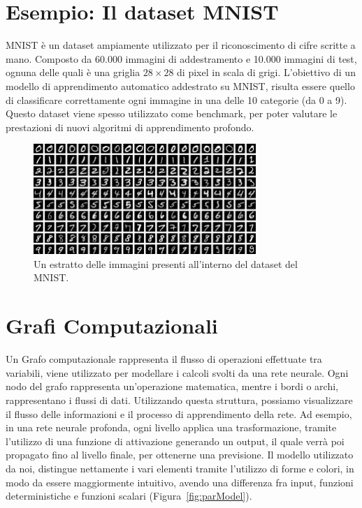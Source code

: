 \section{Esempio: Il dataset MNIST}
MNIST è un dataset ampiamente utilizzato per il riconoscimento di cifre scritte a mano. Composto da 60.000 immagini di addestramento e 10.000 immagini di test, ognuna delle quali è una griglia $28\times28$ di pixel in scala di grigi. L'obiettivo di un modello di apprendimento automatico addestrato su MNIST, risulta essere quello di classificare correttamente ogni immagine in una delle 10 categorie (da 0 a 9). Questo dataset viene spesso utilizzato come benchmark, per poter valutare le prestazioni di nuovi algoritmi di apprendimento profondo.
\\
\begin{figure}[ht]
    \centering
    \includegraphics[width=0.75\textwidth]{figure/MNIST_dataset_example.png}
    \caption{Un estratto delle immagini presenti all'interno del dataset del MNIST.}
\end{figure}

\section{Grafi Computazionali}
Un Grafo computazionale rappresenta il flusso di operazioni effettuate tra variabili, viene utilizzato per modellare i calcoli svolti da una rete neurale. Ogni nodo del grafo rappresenta un'operazione matematica, mentre i bordi o archi, rappresentano i flussi di dati. Utilizzando questa struttura, possiamo visualizzare il flusso delle informazioni e il processo di apprendimento della rete. Ad esempio, in una rete neurale profonda, ogni livello applica una trasformazione, tramite l'utilizzo di una funzione di attivazione generando un output, il quale verrà poi propagato fino al livello finale, per ottenerne una previsione. Il modello utilizzato da noi, distingue nettamente i vari elementi tramite l'utilizzo di forme e colori, in modo da essere maggiormente intuitivo, avendo una differenza fra input, funzioni deterministiche e funzioni scalari (Figura~\ref{fig:parModel}).


